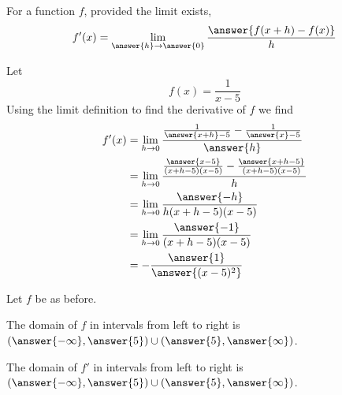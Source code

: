 \documentclass{ximera}
\author{Nela Lakos \and Kyle Parsons}
\begin{document}
\begin{exercise}

For a function $f$, provided the limit exists,
\[
f'(x) = \lim_{\answer{h}\to\answer{0}}\frac{\answer{f(x+h)-f(x)}}{h}
\]

\begin{exercise}

Let 
\[
f(x) = \frac{1}{x-5}
\]
Using the limit definition to find the derivative of $f$ we find
\begin{align*}
f'(x) &= \lim_{h\to0}\frac{\frac{1}{\answer{x+h}-5}-\frac{1}{\answer{x}-5}}{\answer{h}}\\
      &= \lim_{h\to0}\frac{\frac{\answer{x-5}}{(x+h-5)(x-5)} - \frac{\answer{x+h-5}}{(x+h-5)(x-5)}}{h}\\
      &= \lim_{h\to0}\frac{\answer{-h}}{h(x+h-5)(x-5)}\\
      &= \lim_{h\to0}\frac{\answer{-1}}{(x+h-5)(x-5)}\\
      &= -\frac{\answer{1}}{\answer{(x-5)^2}}
\end{align*}

\begin{exercise}

Let $f$ be as before.

The domain of $f$ in intervals from left to right is $\left(\answer{-\infty},\answer{5}\right)\cup\left(\answer{5},\answer{\infty}\right)$.

The domain of $f'$ in intervals from left to right is $\left(\answer{-\infty},\answer{5}\right)\cup\left(\answer{5},\answer{\infty}\right)$.


\end{exercise}
\end{exercise}
\end{exercise}
\end{document}
